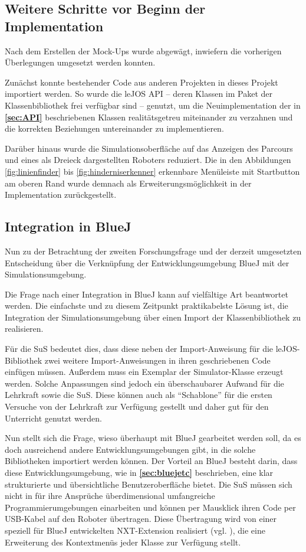 \documentclass[paper=a4, DIV=calc, BCOR=12mm, twoside=on, onecolumn=on, open = right, titlepage =on, parskip =half-, headsepline = on, footsepline = off, chapterprefix = off, appendixprefix = on, fontsize = 12pt, numbers = noenddot, abstract = on]{scrbook}
\begin{document}
\par \singlespacing
\subsection{Weitere Schritte vor Beginn der Implementation}
\onehalfspacing
Nach dem Erstellen der Mock-Ups wurde abgewägt, inwiefern die vorherigen Überlegungen umgesetzt werden konnten. 

Zunächst konnte bestehender Code aus anderen Projekten in dieses Projekt importiert werden. So wurde die leJOS API -- deren Klassen im Paket der Klassenbibliothek frei verfügbar sind -- genutzt, um die Neuimplementation der in \textbf{\ref{sec:API}} beschriebenen Klassen realitätsgetreu miteinander zu verzahnen und die korrekten Beziehungen untereinander zu implementieren.

Darüber hinaus wurde die Simulationsoberfläche auf das Anzeigen des Parcours und eines als Dreieck dargestellten Roboters reduziert. Die in den Abbildungen \ref{fig:linienfinder} bis  \ref{fig:hinderniserkenner} erkennbare Menüleiste mit Startbutton am oberen Rand wurde demnach als Erweiterungsmöglichkeit in der Implementation zurückgestellt.

\par \singlespacing
\subsection{Integration in BlueJ}
\label{sec:integration}
\onehalfspacing
Nun zu der Betrachtung der zweiten Forschungsfrage und der derzeit umgesetzten Entscheidung über die Verknüpfung der Entwicklungsumgebung BlueJ mit der Simulationsumgebung.

Die Frage nach einer Integration in BlueJ kann auf vielfältige Art beantwortet werden. Die einfachste und zu diesem Zeitpunkt praktikabelste Lösung ist, die Integration der Simulationsumgebung über einen Import der Klassenbibliothek zu realisieren.

Für die SuS bedeutet dies, dass diese neben der Import-Anweisung für die leJOS-Bibliothek zwei weitere Import-Anweisungen in ihren geschriebenen Code einfügen müssen. Außerdem muss ein Exemplar der Simulator-Klasse erzeugt werden. Solche Anpassungen sind jedoch ein überschaubarer Aufwand für die Lehrkraft sowie die SuS. Diese können auch als "`Schablone"' für die ersten Versuche von der Lehrkraft zur Verfügung gestellt und daher gut für den Unterricht genutzt werden.

Nun stellt sich die Frage, wieso überhaupt mit BlueJ gearbeitet werden soll, da es doch ausreichend andere Entwicklungsumgebungen gibt, in die solche Bibliotheken importiert werden können.
Der Vorteil an BlueJ besteht darin, dass diese Entwicklungsumgebung, wie in \textbf{\ref{sec:bluejetc}} beschrieben, eine klar strukturierte und übersichtliche Benutzeroberfläche bietet. Die SuS müssen sich nicht in für ihre Ansprüche überdimensional umfangreiche Programmierumgebungen einarbeiten und können per Mausklick ihren Code per USB-Kabel auf den Roboter übertragen. Diese Übertragung wird von einer speziell für BlueJ entwickelten NXT-Extension realisiert (vgl. \cite{bowes:12}), die eine Erweiterung des Kontextmenüs jeder Klasse zur Verfügung stellt. 
\end{document}
